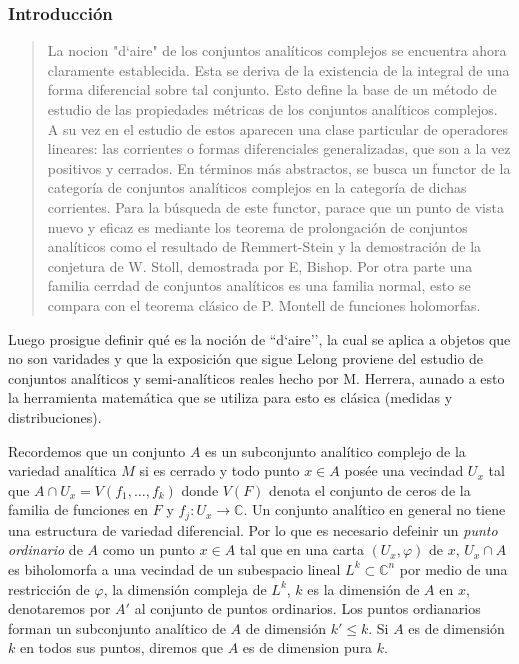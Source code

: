 \documentclass[letterpaper]{article}
\newcommand{\co}{\ensuremath{\mathbb C }}
\newcommand{\con}{\ensuremath{\mathbb{C}^n}}
\begin{document}
\subsubsection{Introducción}
\label{sec:org587bf07}
\begin{quote}
La nocion "d`aire" de los conjuntos analíticos complejos se encuentra ahora claramente establecida. Esta se deriva de la existencia de la integral de una forma diferencial sobre tal conjunto. Esto define la base de un método de estudio de las propiedades métricas de los conjuntos analíticos complejos. A su vez en el estudio de estos aparecen una clase particular de operadores lineares: las corrientes o formas diferenciales generalizadas, que son a la vez positivos y cerrados. En términos más abstractos, se busca un functor de la categoría de conjuntos analíticos complejos en la categoría de dichas corrientes. Para la búsqueda de este functor, parace que un punto de vista nuevo y eficaz es mediante los teorema de prolongación de conjuntos analíticos como el resultado de Remmert-Stein y la demostración de la conjetura de W. Stoll, demostrada por E, Bishop. Por otra parte una familia cerrdad de conjuntos analíticos es una familia normal, esto se compara con el teorema clásico de P. Montell de funciones holomorfas.
\end{quote}

\noindent Luego prosigue definir qué es la noción de ``d`aire'', la cual se aplica a objetos que no son varidades y que la exposición que sigue Lelong proviene del estudio de conjuntos analíticos y semi-analíticos reales hecho por M. Herrera, aunado a esto la herramienta matemática que se utiliza para esto es clásica (medidas y distribuciones).

Recordemos que un conjunto \(A\) es un subconjunto analítico complejo de la variedad analítica \(M\) si es cerrado y todo punto \(x\in A\) posée una vecindad \(U_x\) tal que \(A\cap U_x=V(f_1,\dots,f_k)\) donde \(V(F)\) denota el conjunto de ceros de la familia de funciones en \(F\) y \(f_j:U_x\rightarrow\co\). Un conjunto analítico en general no tiene una estructura de variedad diferencial. Por lo que es necesario defeinir un \emph{punto ordinario} de \(A\) como un punto \(x\in A\) tal que en una carta \((U_x,\varphi)\) de \(x\), \(U_x\cap A\) es biholomorfa a una vecindad de un subespacio lineal \(L^{k}\subset\con\) por medio de una restricción de \(\varphi\), la dimensión compleja de \(L^{k}\), \(k\) es la dimensión de \(A\) en \(x\), denotaremos por \(A'\) al conjunto de puntos ordinarios. Los puntos ordianarios forman un subconjunto analítico de \(A\) de dimensión \(k'\leq k\). Si \(A\) es de dimensión \(k\) en todos sus puntos, diremos que \(A\) es de dimension pura \(k\).
\end{document}
